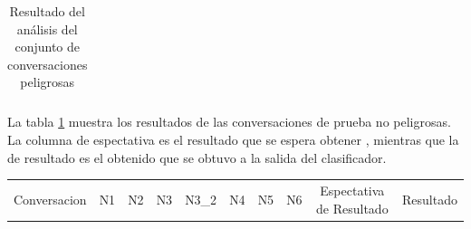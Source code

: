 \begin{table}[h]
\begin{tabular}{|c|c|c|c|c|c|c|c|c|c|}
\end{tabular}
\label{tab:tablaresultadosconjuntopruebapeligroso}
\caption{Resultado del an\'alisis del conjunto de conversaciones peligrosas}
\end{table}
La tabla \ref{tab:tablaresultadosconjuntopruebapeligroso} muestra los resultados de las conversaciones de prueba no peligrosas. La columna de espectativa es el resultado que se espera obtener , mientras que la de resultado es el obtenido que se obtuvo a la salida del clasificador.

\begin{table}
\begin{tabular}{|c|c|c|c|c|c|c|c|c|c|}
\hline
Conversacion & N1 & N2 & N3 & N3\_2 & N4 & N5 & N6 & Espectativa de Resultado & Resultado \\


\end{tabular}
\end{table}
